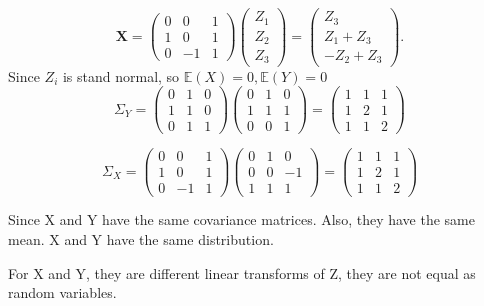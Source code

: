 \documentclass{article}
\begin{document}
\[
\mathbf{X} = 
\begin{pmatrix} 
0 & 0 & 1 \\ 
1 & 0 & 1 \\ 
0 & -1 & 1 
\end{pmatrix} 
\begin{pmatrix} 
Z_1 \\ 
Z_2 \\ 
Z_3 
\end{pmatrix} 
= 
\begin{pmatrix}
Z_3 \\
Z_1 + Z_3 \\
-Z_2 + Z_3
\end{pmatrix}.
\]
Since $Z_i$ is stand normal, so $\mathbb{E}(X)=0, \mathbb{E}(Y)=0$
\[
\Sigma_{Y} =
\begin{pmatrix} 
0 & 1 & 0 \\ 
1 & 1 & 0 \\ 
0 & 1 & 1 
\end{pmatrix} 
\begin{pmatrix} 
0 & 1 & 0 \\ 
1 & 1 & 1 \\ 
0 & 0 & 1 
\end{pmatrix} 
= \begin{pmatrix} 
1 & 1 & 1 \\ 
1 & 2 & 1 \\ 
1 & 1 & 2 
\end{pmatrix}
\]

\[
\Sigma_{X}=
\begin{pmatrix} 
0 & 0 & 1 \\ 
1 & 0 & 1 \\ 
0 & -1 & 1 
\end{pmatrix} 
\begin{pmatrix} 
0 & 1 & 0 \\ 
0 & 0 & -1 \\ 
1 & 1 & 1 
\end{pmatrix} 
= \begin{pmatrix} 
1 & 1 & 1 \\ 
1 & 2 & 1 \\ 
1 & 1 & 2 
\end{pmatrix}
\]

Since X and Y have the same covariance matrices. 
Also, they have the same mean. X and Y have the
same distribution.

For X and Y, they are different linear transforms of Z, they are not equal as random variables.

 
\end{document}
